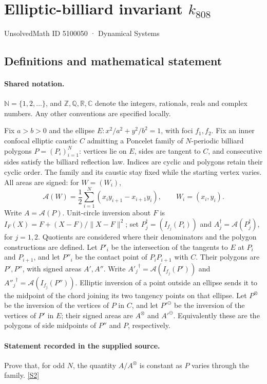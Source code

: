 \documentclass[11pt]{article}
\newcommand{\sref}[2]{\hyperlink{source:#1:#2}{[S#2]}}
\begin{document}
\setcounter{section}{5100049}
\section{Elliptic-billiard invariant $k_{808}$}\label{5100050}
{\small\sffamily UnsolvedMath ID 5100050 · Dynamical Systems}
\subsection{Definitions and mathematical statement}

\paragraph{Shared notation.}$\mathbb N=\{1,2,\ldots\}$, and $\mathbb Z,\mathbb Q,\mathbb R,\mathbb C$ denote the integers, rationals, reals and complex numbers. Any other conventions are specified locally.


Fix $a>b>0$ and the ellipse $E:x^2/a^2+y^2/b^2=1$, with foci $f_1,f_2$. Fix an inner confocal elliptic caustic $C$ admitting a Poncelet family of $N$-periodic billiard polygons $P=(P_i)_{i=1}^N$: vertices lie on $E$, sides are tangent to $C$, and consecutive sides satisfy the billiard reflection law. Indices are cyclic and polygons retain their cyclic order. The family and its caustic stay fixed while the starting vertex varies. All areas are signed: for $W=(W_i)$,
\[\mathcal A(W)=\frac12\sum_{i=1}^N(x_i y_{i+1}-x_{i+1}y_i),\qquad W_i=(x_i,y_i).\]
Write $A=\mathcal A(P)$. Unit-circle inversion about $F$ is $I_F(X)=F+(X-F)/\lVert X-F\rVert^2$; set $P_j^\dagger=(I_{f_j}(P_i))$ and $A_j^\dagger=\mathcal A(P_j^\dagger)$, for $j=1,2$. Quotients are considered where their denominators and the polygon constructions are defined. Let $P'_i$ be the intersection of the tangents to $E$ at $P_i$ and $P_{i+1}$, and let $P''_i$ be the contact point of $P_iP_{i+1}$ with $C$. Their polygons are $P',P''$, with signed areas $A',A''$. Write ${A'_j}^\dagger=\mathcal A(I_{f_j}(P'))$ and ${A''_j}^\dagger=\mathcal A(I_{f_j}(P''))$. Elliptic inversion of a point outside an ellipse sends it to the midpoint of the chord joining its two tangency points on that ellipse. Let $P^\otimes$ be the inversion of the vertices of $P$ in $C$, and let ${P'}^\ominus$ be the inversion of the vertices of $P'$ in $E$; their signed areas are $A^\otimes$ and ${A'}^\ominus$. Equivalently these are the polygons of side midpoints of $P''$ and $P$, respectively.
\paragraph{Statement recorded in the supplied source.}
Prove that, for odd $N$, the quantity $A/A^\otimes$ is constant as $P$ varies through the family. \sref{5100050}{2}
\end{document}
